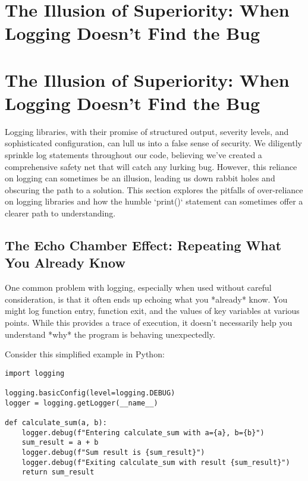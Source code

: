 \documentclass{article}
\begin{document}
{{{{%
\newpage

\section*{The Illusion of Superiority: When Logging Doesn't Find the Bug} %
\label{chapter-7-10-The_Illusion_of_Superiority__When_Loggin}

\section*{The Illusion of Superiority: When Logging Doesn't Find the Bug}

Logging libraries, with their promise of structured output, severity levels, and sophisticated configuration, can lull us into a false sense of security. We diligently sprinkle log statements throughout our code, believing we've created a comprehensive safety net that will catch any lurking bug. However, this reliance on logging can sometimes be an illusion, leading us down rabbit holes and obscuring the path to a solution. This section explores the pitfalls of over-reliance on logging libraries and how the humble `print()` statement can sometimes offer a clearer path to understanding.

\subsection*{The Echo Chamber Effect: Repeating What You Already Know}

One common problem with logging, especially when used without careful consideration, is that it often ends up echoing what you *already* know. You might log function entry, function exit, and the values of key variables at various points. While this provides a trace of execution, it doesn't necessarily help you understand *why* the program is behaving unexpectedly.

Consider this simplified example in Python:

\begin{verbatim}
import logging

logging.basicConfig(level=logging.DEBUG)
logger = logging.getLogger(__name__)

def calculate_sum(a, b):
    logger.debug(f"Entering calculate_sum with a={a}, b={b}")
    sum_result = a + b
    logger.debug(f"Sum result is {sum_result}")
    logger.debug(f"Exiting calculate_sum with result {sum_result}")
    return sum_result


\end{verbatim}}}}}
\end{document}
